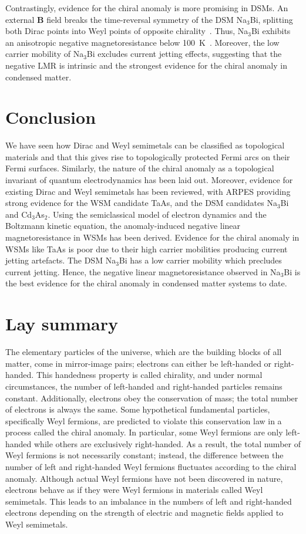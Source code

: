 \documentclass[11pt, a4paper]{article}
\begin{document}
Contrastingly, evidence for the chiral anomaly is more promising in DSMs.
An external $\bm{B}$ field breaks the time-reversal symmetry of 
the DSM Na$_3$Bi, splitting both Dirac points into
Weyl points of opposite chirality~\cite{DSM_Na3Bi}.
Thus, Na$_3$Bi exhibits an anisotropic negative
magnetoresistance below \qty{100}{\kelvin}~\cite{Squeezetest}.
Moreover, the low carrier mobility of Na$_3$Bi excludes current jetting effects,
suggesting that the negative LMR is intrinsic and
the strongest evidence for the chiral anomaly in condensed matter.

\section{Conclusion}

We have seen how Dirac and Weyl semimetals can be classified as topological
materials and that this gives rise to topologically protected Fermi arcs on their
Fermi surfaces. Similarly, the nature of the chiral anomaly as a topological
invariant of quantum electrodynamics has been laid out. Moreover, 
evidence for existing Dirac and Weyl semimetals has been reviewed, with ARPES
providing strong evidence for the WSM candidate TaAs, and the DSM candidates
Na$_3$Bi and Cd$_3$As$_2$. Using the semiclassical model of electron dynamics
and the Boltzmann kinetic equation, the anomaly-induced negative linear
magnetoresistance in WSMs has been derived. Evidence for the chiral anomaly
in WSMs like TaAs is poor due to their high carrier mobilities producing current jetting
artefacts. The DSM Na$_3$Bi has a low carrier mobility which precludes current
jetting. Hence, the negative linear magnetoresistance observed in Na$_3$Bi is 
the best evidence for the chiral anomaly in condensed matter systems to date.

\newpage


\section{Lay summary}

The elementary particles of the universe, which are the building blocks of all matter,
come in mirror-image pairs; electrons can either be left-handed or right-handed.
This handedness property is called chirality, and under normal circumstances,
the number of left-handed and right-handed particles remains constant.
Additionally, electrons obey the conservation of mass; the total number of electrons
is always the same. Some hypothetical fundamental particles, specifically Weyl
fermions, are predicted to violate this conservation law in a process
called the chiral anomaly. In particular, some Weyl fermions are only
left-handed while others are exclusively right-handed.
As a result, the total number of Weyl fermions is not 
necessarily constant; instead, the difference between the number
of left and right-handed Weyl fermions fluctuates according to the chiral anomaly.
Although actual Weyl fermions have not been discovered in nature,
electrons behave as if they were Weyl fermions in materials called Weyl
semimetals. This leads to an imbalance
in the numbers of left and right-handed electrons depending on
the strength of electric and magnetic fields applied to Weyl semimetals.
\end{document}
